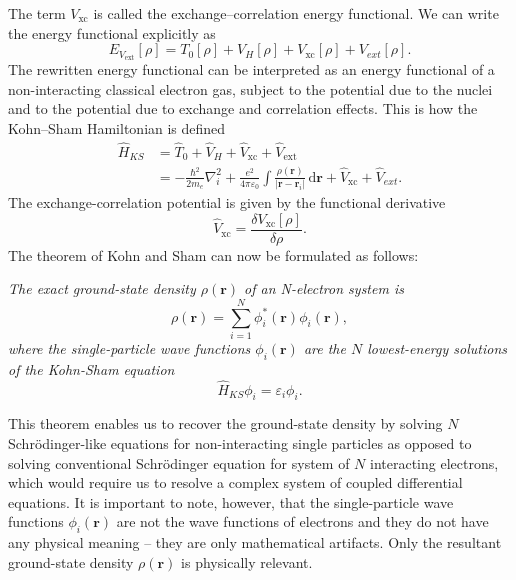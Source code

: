 The term $V_\mathrm{xc}$ is called the exchange--correlation energy
functional. We can write the energy functional explicitly as
\begin{equation}
  E_{V_\mathrm{ext}}[\rho] = T_0[\rho] + V_H[\rho] + V_\mathrm{xc}[\rho]
  + V_{ext}[\rho].
\end{equation}
The rewritten energy functional can be interpreted as an energy functional of
a non-interacting classical electron gas, subject to the potential due to the
nuclei and to the potential due to exchange and correlation effects. This is
how the Kohn--Sham Hamiltonian is defined
\begin{equation}
\begin{alignedat}{2}
  \hat H_{KS} &= \hat T_0 + \hat V_H + \hat V_\mathrm{xc} +
  \hat V_\mathrm{ext} \\
  &= -\frac{\hbar^2}{2 m_e} \nabla_i^2
  + \frac{e^2}{4 \pi \varepsilon_0} \int
  \frac{\rho(\mathbf{r})}{|\mathbf{r} - \mathbf{r}_i|} \, \mathrm{d}\mathbf{r}
  + \hat V_\mathrm{xc} + \hat V_{ext}.
\end{alignedat}
\end{equation}
The exchange-correlation potential is given by the functional derivative
\begin{equation}
  \hat V_\mathrm{xc} = \frac{\delta V_\mathrm{xc}[\rho]}{\delta \rho}.
\end{equation}
The theorem of Kohn and Sham can now be formulated as follows:
\begin{displayquote}
  \textit{
    The exact ground-state density $\rho(\mathbf{r})$ of an N-electron system
    is
  }
  \begin{equation}
    \rho(\mathbf{r}) = \sum_{i=1}^N \phi^*_i(\mathbf{r}) \phi_i(\mathbf{r}),
  \end{equation}
  \textit{
    where the single-particle wave functions $\phi_i(\mathbf{r})$ are the $N$
    lowest-energy solutions of the Kohn-Sham equation
  }
  \begin{equation}
    \hat H_{KS} \phi_i = \varepsilon_i \phi_i.
  \end{equation}
\end{displayquote}
This theorem enables us to recover the ground-state density by solving $N$
Schrödinger-like equations for non-interacting single particles as opposed to
solving conventional Schrödinger equation for system of $N$ interacting
electrons, which would require us to resolve a complex system of coupled
differential equations. It is important to note, however, that the
single-particle wave functions $\phi_i(\mathbf{r})$ are not the wave functions
of electrons and they do not have any physical meaning -- they are only
mathematical artifacts. Only the resultant ground-state density
$\rho(\mathbf{r})$ is physically relevant.

